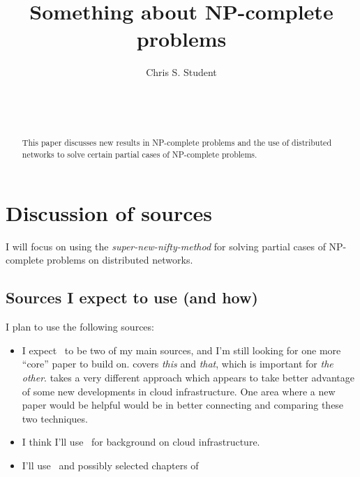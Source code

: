 \documentclass{sig-alternate}
\begin{document}

\title{Something about NP-complete problems}


\author{
\alignauthor
Chris S. Student\\
	\\
	\\
	\\
}

\maketitle

\begin{abstract}
This paper discusses new results in NP-complete problems and the use of distributed
networks to solve certain partial cases of NP-complete problems.
\end{abstract}

\section{Discussion of sources}

I will focus on using the \emph{super-new-nifty-method} for solving partial cases of
NP-complete problems on distributed networks.

\subsection{Sources I expect to use (and how)}

I plan to use the following sources:
\begin{itemize}
\item I expect~\cite{OM:2008, prakash2013fractional} to be two of my main sources, and I'm still looking for one more ``core'' paper to build on. \cite{OM:2008} covers \emph{this} and \emph{that}, which is important for \emph{the other}. \cite{prakash2013fractional} takes a very different approach which appears to take better advantage of some new developments in cloud infrastructure. One area where a new paper would be helpful would be in better connecting and comparing these two techniques.
\item I think I'll use~\cite{Brun:2008} for background on cloud infrastructure. 
\item I'll use~\cite{Aaronson:2005, wiki:np-complete} and possibly selected chapters of~\cite{Garey:1979}
\end{itemize}
\end{document}
